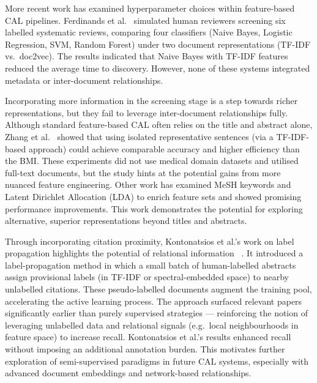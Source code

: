\documentclass[10pt, english]{article}
\begin{document}
More recent work has examined hyperparameter choices within feature-based CAL pipelines. Ferdinands et al.~\cite{ferdinands_performance_2023} simulated human reviewers screening six labelled systematic reviews, comparing four classifiers (Naive Bayes, Logistic Regression, SVM, Random Forest) under two document representations (TF-IDF vs.\ doc2vec). The results indicated that Naive Bayes with TF-IDF features reduced the average time to discovery. However, none of these systems integrated metadata or inter-document relationships.

Incorporating more information in the screening stage is a step towards richer representations, but they fail to leverage inter-document relationships fully. Although standard feature-based CAL often relies on the title and abstract alone, Zhang et al.~\cite{zhang_evaluating_2020} showed that using isolated representative sentences (via a TF-IDF-based approach) could achieve comparable accuracy and higher efficiency than the BMI. These experiments did not use medical domain datasets and utilised full-text documents, but the study hints at the potential gains from more nuanced feature engineering. Other work has examined MeSH keywords \cite{miwa_reducing_2014} and Latent Dirichlet Allocation (LDA) \cite{hashimoto_topic_2016, miwa_reducing_2014} to enrich feature sets and showed promising performance improvements. This work demonstrates the potential for exploring alternative, superior representations beyond titles and abstracts.

Through incorporating citation proximity, Kontonatsios et al.'s work on label propagation highlights the potential of relational information ~\cite{kontonatsios_semi-supervised_2017}. It introduced a label-propagation method in which a small batch of human-labelled abstracts assign provisional labels (in TF-IDF or spectral-embedded space) to nearby unlabelled citations. These pseudo-labelled documents augment the training pool, accelerating the active learning process. The approach surfaced relevant papers significantly earlier than purely supervised strategies — reinforcing the notion of leveraging unlabelled data and relational signals (e.g.\ local neighbourhoods in feature space) to increase recall. Kontonatsios et al.’s results enhanced recall without imposing an additional annotation burden. This motivates further exploration of semi-supervised paradigms in future CAL systems, especially with advanced document embeddings and network-based relationships.
\end{document}
